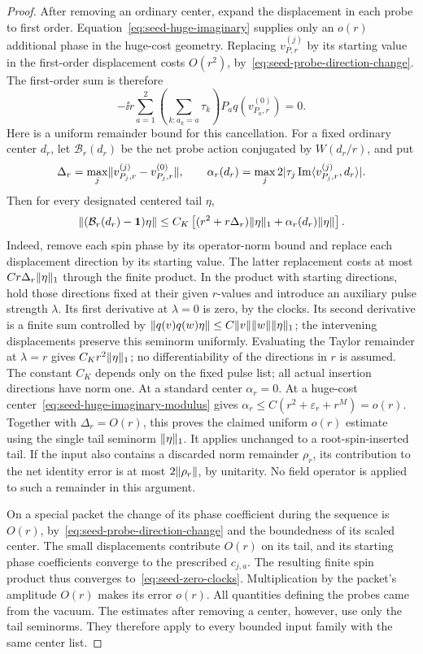 \begin{proof}
After removing an ordinary center, expand the displacement in each
probe to first order.  Equation~\eqref{eq:seed-huge-imaginary} supplies
only an \(o(r)\) additional phase in the huge-cost geometry.  Replacing
\(v_{P,r}^{(j)}\) by its starting value in the first-order displacement
costs \(O(r^2)\), by~\eqref{eq:seed-probe-direction-change}.
The first-order sum is therefore
\[
 -\ii r\sum_{a=1}^2
 \left(\sum_{k:a_k=a}\tau_k\right)P_aq(v_{P_a,r}^{(0)})=0.
\]
Here is a uniform remainder bound for this cancellation.  For a fixed
ordinary center \(d_r\), let \(\mathcal B_r(d_r)\) be the net probe
action conjugated by \(W(d_r/r)\), and put
\[
 \Delta_r=\max_j\lVert v_{P_j,r}^{(j)}-v_{P_j,r}^{(0)}\rVert,\qquad
 \alpha_r(d_r)=\max_j
       2\lvert \tau_j\operatorname{Im}\langle v_{P_j,r}^{(j)},d_r\rangle\rvert.
\]
Then for every designated centered tail \(\eta\),
\begin{equation}
\label{eq:seed-uniform-probe-bound}
 \lVert (\mathcal B_r(d_r)-\mathbf 1)\eta\rVert
 \leq C_K\left[
       (r^2+r\Delta_r)\lVert \eta\rVert_1
           +\alpha_r(d_r)\lVert \eta\rVert\right].
\end{equation}
Indeed, remove each spin phase by its operator-norm bound and replace
each displacement direction by its starting value.  The latter
replacement costs at most \(C r\Delta_r\lVert \eta\rVert_1\) through the
finite product.  In the product with starting directions, hold those
directions fixed at their given \(r\)-values and introduce an auxiliary
pulse strength \(\lambda\).  Its first derivative at \(\lambda=0\)
is zero, by the clocks.  Its second derivative is a
finite sum controlled by
\(\lVert q(v)q(w)\eta\rVert\leq C\lVert v\rVert\lVert w\rVert\lVert \eta\rVert_1\);
the intervening displacements preserve this seminorm uniformly.
Evaluating the Taylor remainder at \(\lambda=r\) gives
\(C_Kr^2\lVert \eta\rVert_1\); no differentiability of the directions in
\(r\) is assumed.
The constant \(C_K\) depends only on the fixed pulse list; all actual
insertion directions have norm one.  At a standard center
\(\alpha_r=0\).  At a huge-cost center~\eqref{eq:seed-huge-imaginary-modulus}
gives \(\alpha_r\leq C(r^2+\varepsilon_r+r^M)=o(r)\).
Together with \(\Delta_r=O(r)\), this proves the claimed uniform
\(o(r)\) estimate using the single tail seminorm \(\lVert \eta\rVert_1\).
It applies unchanged to a root-spin-inserted tail.  If the input also
contains a discarded norm remainder \(\rho_r\), its contribution to
the net identity error is at most \(2\lVert \rho_r\rVert\), by unitarity.
No field operator is applied to such a remainder in this argument.

On a special packet the change of its phase coefficient during the
sequence is \(O(r)\), by~\eqref{eq:seed-probe-direction-change} and the
boundedness of its scaled center.  The small displacements contribute
\(O(r)\) on its tail, and its starting phase coefficients converge to
the prescribed \(c_{j,a}\).  The resulting finite spin product thus
converges to~\eqref{eq:seed-zero-clocks}.  Multiplication by the packet's
amplitude \(O(r)\) makes its error \(o(r)\).
All quantities defining the probes came from the vacuum.  The estimates
after removing a center, however, use only the tail seminorms.  They
therefore apply to every bounded input family with the same center list.
\end{proof}

